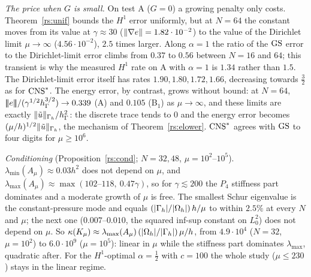 \emph{The price when $G$ is small.} On test A ($G=0$) a growing penalty only costs. Theorem~\ref{rs:unif} bounds the $H^1$ error uniformly, but at $N=64$ the constant moves from its value at $\gamma\approx30$ ($\lVert \nabla e\rVert=1.82\cdot10^{-2}$) to the value of the Dirichlet limit $\mu\to\infty$ ($4.56\cdot10^{-2}$), $2.5$ times larger. Along $\alpha=1$ the ratio of the $\mathrm{GS}$ error to the Dirichlet-limit error climbs from $0.37$ to $0.56$ between $N=16$ and $64$; this transient is why the measured $H^1$ rate on A with $\alpha=1$ is $1.34$ rather than $1.5$. The Dirichlet-limit error itself has rates $1.90,1.80,1.72,1.66$, decreasing towards $\frac32$ as for $\mathrm{CNS}^\ast$. The energy error, by contrast, grows without bound: at $N=64$, $|\!|\!|e|\!|\!|/(\gamma^{1/2}h_\Gamma^{3/2})\to0.339$ (A) and $0.105$ (B$_1$) as $\mu\to\infty$, and these limits are exactly $\lVert \tilde u\rVert_{\Gamma_h}/h_\Gamma^2$: the discrete trace tends to $0$ and the energy error becomes $(\mu/h)^{1/2}\lVert \tilde u\rVert_{\Gamma_h}$, the mechanism of Theorem~\ref{rs:elower}. $\mathrm{CNS}^\ast$ agrees with $\mathrm{GS}$ to four digits for $\mu\ge10^6$.

\emph{Conditioning} (Proposition~\ref{rs:cond}; $N=32,48$, $\mu=10^2$--$10^5$). $\lambda_{\min}(A_\mu)\approx0.03h^2$ does not depend on $\mu$, and $\lambda_{\max}(A_\mu)\approx\max(102\text{--}118,\ 0.47\gamma)$, so for $\gamma\lesssim200$ the $P_4$ stiffness part dominates and a moderate growth of $\mu$ is free. The smallest Schur eigenvalue is the constant-pressure mode and equals $(|\Gamma_h|/|\Omega_h|)\,h/\mu$ to within $2.5\%$ at every $N$ and $\mu$; the next one ($0.007$--$0.010$, the squared inf-sup constant on $L^2_0$) does not depend on $\mu$. So $\kappa(K_\mu)\approx\lambda_{\max}(A_\mu)\,(|\Omega_h|/|\Gamma_h|)\,\mu/h$, from $4.9\cdot10^4$ ($N=32$, $\mu=10^2$) to $6.0\cdot10^9$ ($\mu=10^5$): linear in $\mu$ while the stiffness part dominates $\lambda_{\max}$, quadratic after. For the $H^1$-optimal $\alpha=\frac12$ with $c=100$ the whole study ($\mu\le230$) stays in the linear regime.

